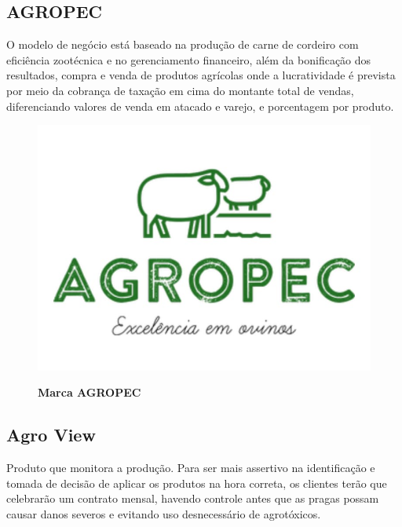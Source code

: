 \subsection{AGROPEC}


O modelo de negócio está baseado na produção de carne de cordeiro com eficiência zootécnica e no gerenciamento financeiro, além da bonificação dos resultados, compra e venda de produtos agrícolas onde a lucratividade é prevista por meio da cobrança de taxação em cima do montante total de vendas, diferenciando valores de venda em atacado e varejo, e porcentagem por produto.


\begin{figure}[H]
\centering
\caption{\textbf{Marca AGROPEC}}
\includegraphics[scale=0.3]{Imagens/agropec.jpg}
\label{figura_18}
\end{figure}

\subsection{Agro View}


Produto que monitora a produção. Para ser mais assertivo na identificação e tomada de decisão de aplicar os produtos na hora correta, os clientes terão que celebrarão um contrato mensal, havendo controle antes que as pragas possam causar danos severos e evitando uso desnecessário de agrotóxicos. 


